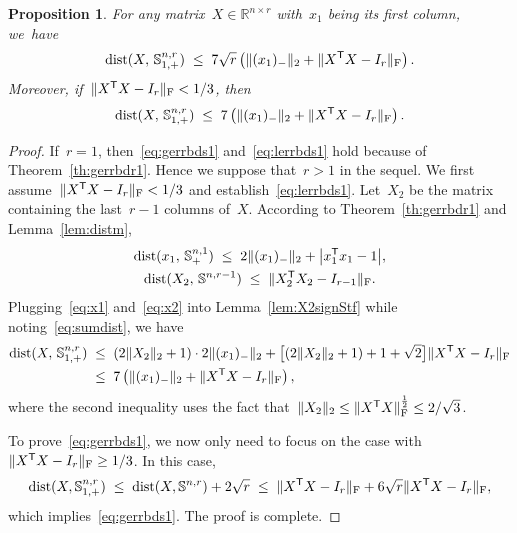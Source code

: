\documentclass[11pt,a4paper]{article}  %
\newtheorem{proposition}{Proposition}%
\theoremstyle{definition}
\DeclareMathOperator{\dist}{dist}
\newcommand{\RR}{\mathbb{R}}
\newcommand{\col}{r}
\newcommand{\stf}[1]{\mathbb{S}^{#1}}
\newcommand{\fro}{{\scriptstyle{\textnormal{F}}}}
\newcommand{\trs}{{\scriptstyle{\mathsf{T}}}}
\begin{document}
\begin{proposition}
    \label{prop:errbds1}
    For any matrix~$X \in \RR^{n\times \col}$ with~$x_1$ being its first column, we~have
    \begin{equation}
        \label{eq:gerrbds1}
        \dist(X,\, \stf{n,\col}_{1,+}) \;\le\;
        7\sqrt{\col}\left(\|(x_1)_{-}\|_2 + \|X^\trs  X - I_\col\|_\fro\right).
    \end{equation}
        Moreover, if~$\|X^\trs X -I_\col\|_\fro < 1/3$, then
    \begin{equation}
        \label{eq:lerrbds1}
        \dist(X,\, \stf{n,\col}_{1,+}) \;\le\;
        7\left( \|(x_1)_{-}\|_2 + \|X^\trs  X - I_\col\|_\fro \right).
    \end{equation}
\end{proposition}
\begin{proof}
    If~$\col = 1$, then~\eqref{eq:gerrbds1} and~\eqref{eq:lerrbds1} hold because of
    Theorem~\ref{th:gerrbdr1}. Hence we suppose that~$\col > 1$ in the sequel.
     We first assume~$\|X^\trs  X - I_\col\|_\fro < 1/3$ and establish~\eqref{eq:lerrbds1}.
    Let~$X_2$ be the matrix containing the last~$\col-1$ columns of~$X$.
 According to Theorem~\ref{th:gerrbdr1} and Lemma~\ref{lem:distm},
    \begin{gather}
        \label{eq:x1} \dist(x_1,\,\stf{n, 1}_+)  %
        \;\le\; 2\|(x_1)_-\|_2 +  \big|x_1^\trs x_1 - 1\big|,\\
        \label{eq:x2} \dist(X_2,\,\stf{n, \col -1})  \;\le\; \|X_2^\trs X_2-I_{\col-1}\|_\fro.
    \end{gather}
    Plugging~\eqref{eq:x1} and~\eqref{eq:x2} into Lemma~\ref{lem:X2signStf} while
    noting~\eqref{eq:sumdist}, we have
\begin{equation}
    \nonumber
    \begin{split}
    \dist(X,\, \stf{n,\col}_{1, +})
    & \;\le\; (2\|X_2\|_2+1)\cdot 2\|(x_1)_-\|_2 + \big[(2\|X_2\|_2+1)+1+\sqrt{2}\big]\|X^\trs X-I_{\col}\|_\fro\\
    & \;\le\; 7\left(\|(x_1)_-\|_2 + \|X^\trs X-I_{\col}\|_\fro\right),
    \end{split}
\end{equation}
where the second inequality uses the fact that~$\|X_2\|_2 \le \|X^\trs X \|_\fro^{\frac{1}{2}} \le 2/\sqrt{3}$.

To prove~\eqref{eq:gerrbds1}, we now only need to focus on the case
with~$\|X^\trs X - I_\col\|_\fro \ge 1/3$. In this case,
\begin{equation}
    \nonumber
    \dist(X, \stf{n, \col}_{1,+})
    \;\le\; \dist(X, \stf{n,\col}) + 2\sqrt{\col}
    \;\le\; \|X^\trs X - I_\col\|_\fro + 6\sqrt{\col}\|X^\trs X - I_\col\|_\fro,
\end{equation}
which implies~\eqref{eq:gerrbds1}. The proof is complete.
\end{proof}
\end{document}
